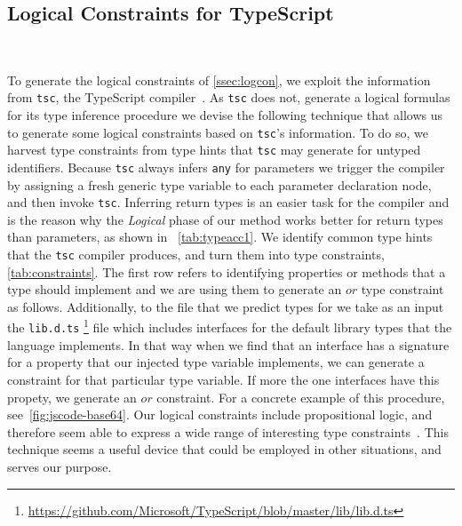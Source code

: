 \documentclass[acmsmall, review, anonymous]{acmart}\settopmatter{printfolios=true,printccs=false,printacmref=false}
\begin{document}
\subsection{Logical Constraints for TypeScript}~\label{ssec:logprodts}

To generate the logical constraints of \cref{ssec:logcon}, we exploit the information from \lstinline+tsc+, the TypeScript compiler~\cite{typescript}. 
As \lstinline+tsc+ does not, generate a logical formulas 
for its type inference procedure we devise the following technique that allows us to generate some logical constraints based on \lstinline+tsc+'s information. To do so, we harvest type constraints from type hints that \lstinline+tsc+ may generate
for untyped identifiers. Because \lstinline+tsc+ always infers \texttt{\small{any}} for parameters we trigger
the compiler by assigning a fresh generic type variable to each parameter declaration node, and then invoke \lstinline+tsc+. 
Inferring return types is an easier task for the compiler and is the reason why the \textit{Logical} phase of our method works better for return types than parameters, as shown in ~\cref{tab:typeacc1}. 
We identify common type hints that the \lstinline+tsc+ compiler produces, and turn them into type constraints, \cref{tab:constraints}. The first row 
refers to identifying properties or methods that a type should implement
and we are using them to generate an $\mathrel{or}$ type constraint as follows. Additionally, to the file that we 
predict types for we take as an input the \lstinline{lib.d.ts} \footnote{\url{https://github.com/Microsoft/TypeScript/blob/master/lib/lib.d.ts}} file which includes interfaces for the default library types that the language implements. In that way when we find that an interface has a signature for a property that our injected type variable implements, we can generate a constraint for that particular type variable. If more the one interfaces have this propety, we generate an $\mathrel{or}$ constraint.
For a concrete example of this procedure, 
see~\cref{fig:jscode-base64}.
Our logical constraints include propositional logic, and therefore seem able to express a wide range of interesting type constraints~\citep{odersky99,pottier05}.
%
This technique seems a useful device that could be employed in other situations, and serves our purpose.
\end{document}
